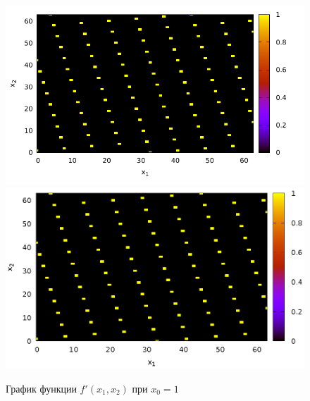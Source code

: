 \begin{figure}
\centering

\ifpdf
\includegraphics[angle=0]
{./part4/quantcomp/picellipticdiscretlog1.pdf}
\else
\includegraphics[angle=0]
{./part4/quantcomp/picellipticdiscretlog1.eps}
\fi

%

\caption{График функции 
$f'(x_1, x_2)$ при $x_0 = 1$} 
\label{fig:part4:quantcomp:dle1}
\end{figure}

